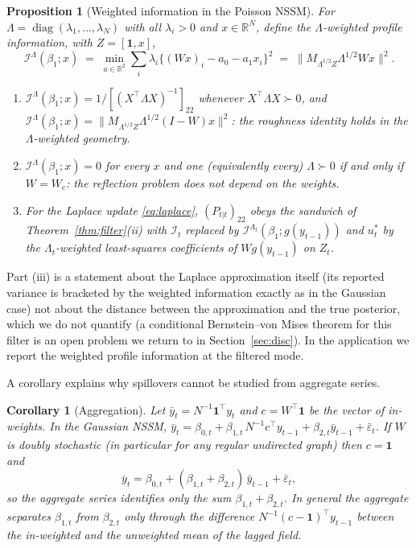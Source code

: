 \documentclass[12pt]{article}
\theoremstyle{plain}
\newtheorem{proposition}{Proposition}
\newtheorem{corollary}{Corollary}
\theoremstyle{definition}
\theoremstyle{remark}
\newcommand{\R}{\mathbb{R}}
\newcommand{\diag}{\operatorname{diag}}
\newcommand{\one}{\mathbf{1}}
\newcommand{\calI}{\mathcal{I}}
\newcommand{\Wc}{W_{\mathrm{c}}}
\newcommand{\T}{^{\top}}
\begin{document}
\begin{proposition}[Weighted information in the Poisson NSSM]\label{prop:weighted}
For $\Lambda=\diag(\lambda_1,\dots,\lambda_N)$ with all $\lambda_i>0$ and $x\in\R^N$, define the $\Lambda$-weighted profile information, with $Z=[\one,x]$,
\[
\calI^\Lambda(\beta_1;x)\;=\;\min_{a\in\R^2}\sum_i\lambda_i\{(Wx)_i-a_0-a_1x_i\}^2\;=\;\|M_{\Lambda^{1/2}Z}\Lambda^{1/2}Wx\|^2 .
\]
\begin{enumerate}[label=(\roman*),leftmargin=*]
\item $\calI^\Lambda(\beta_1;x)=1/[(X\T\Lambda X)^{-1}]_{22}$ whenever $X\T\Lambda X\succ0$, and $\calI^\Lambda(\beta_1;x)=\|M_{\Lambda^{1/2}Z}\Lambda^{1/2}(I-W)x\|^2$: the roughness identity holds in the $\Lambda$-weighted geometry.
\item $\calI^\Lambda(\beta_1;x)=0$ for every $x$ and one \textup{(}equivalently every\textup{)} $\Lambda\succ0$ if and only if $W=\Wc$: the reflection problem does not depend on the weights.
\item For the Laplace update \eqref{eq:laplace}, $(P_{t|t})_{22}$ obeys the sandwich of Theorem~\ref{thm:filter}\textup{(ii)} with $\calI_t$ replaced by $\calI^{\Lambda_t}(\beta_1;g(y_{t-1}))$ and $u_t^*$ by the $\Lambda_t$-weighted least-squares coefficients of $Wg(y_{t-1})$ on $Z_t$.
\end{enumerate}
\end{proposition}

Part (iii) is a statement about the Laplace approximation itself (its reported variance is bracketed by the weighted information exactly as in the Gaussian case) not about the distance between the approximation and the true posterior, which we do not quantify (a conditional Bernstein--von Mises theorem for this filter is an open problem we return to in Section~\ref{sec:disc}). In the application we report the weighted profile information at the filtered mode.

A corollary explains why spillovers cannot be studied from aggregate series.

\begin{corollary}[Aggregation]\label{cor:agg}
Let $\bar y_t=N^{-1}\one\T y_t$ and $c=W\T\one$ be the vector of in-weights. In the Gaussian NSSM, $\bar y_t=\beta_{0,t}+\beta_{1,t}\,N^{-1}c\T y_{t-1}+\beta_{2,t}\bar y_{t-1}+\bar\varepsilon_t$. If $W$ is doubly stochastic \textup{(}in particular for any regular undirected graph\textup{)} then $c=\one$ and
\[
\bar y_t=\beta_{0,t}+(\beta_{1,t}+\beta_{2,t})\,\bar y_{t-1}+\bar\varepsilon_t ,
\]
so the aggregate series identifies only the sum $\beta_{1,t}+\beta_{2,t}$. In general the aggregate separates $\beta_{1,t}$ from $\beta_{2,t}$ only through the difference $N^{-1}(c-\one)\T y_{t-1}$ between the in-weighted and the unweighted mean of the lagged field.
\end{corollary}
\end{document}
